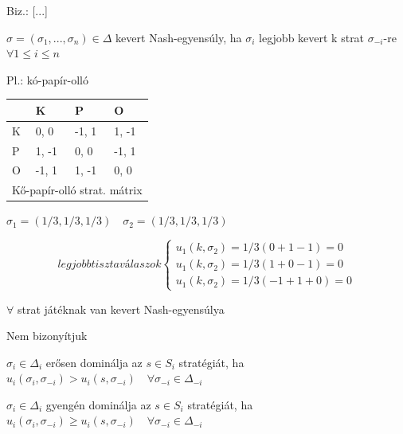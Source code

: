 Biz.: [...]

\begin{definition}{}{}
	$\sigma = (\sigma_1, ..., \sigma_n) \in \Delta$ kevert Nash-egyensúly, ha $\sigma_i$ legjobb kevert k strat $\sigma_{-i}$-re $\forall 1\leq i \leq n$
\end{definition}

Pl.: kó-papír-olló
\begin{center}
	\begin{tabular}{llll}
		\hline
		\multicolumn{1}{|l|}{}  & \multicolumn{1}{l|}{K}     & \multicolumn{1}{l|}{P}     & \multicolumn{1}{l|}{O}     \\ \hline
		\multicolumn{1}{|l|}{K} & \multicolumn{1}{l|}{0, 0}  & \multicolumn{1}{l|}{-1, 1} & \multicolumn{1}{l|}{1, -1} \\ \hline
		\multicolumn{1}{|l|}{P} & \multicolumn{1}{l|}{1, -1} & \multicolumn{1}{l|}{0, 0}  & \multicolumn{1}{l|}{-1, 1} \\ \hline
		\multicolumn{1}{|l|}{O} & \multicolumn{1}{l|}{-1, 1} & \multicolumn{1}{l|}{1, -1} & \multicolumn{1}{l|}{0, 0}  \\ \hline
		\multicolumn{4}{l}{Kő-papír-olló strat. mátrix}                                                               
	\end{tabular}
\end{center}

\begin{center}
	$\sigma_1 = (1/3, 1/3, 1/3) \quad \sigma_2 = (1/3, 1/3, 1/3)$
\end{center}

\[
legjobb tiszta válaszok
\begin{cases}
	u_1(k, \sigma_2) = 1/3(0+1-1)=0 \\
	u_1(k, \sigma_2) = 1/3(1+0-1)=0 \\
	u_1(k, \sigma_2) = 1/3(-1+1+0)=0
\end{cases}
\]

\begin{theorem}{}{}
	$\forall$ strat játéknak van kevert Nash-egyensúlya
\end{theorem}

Nem bizonyítjuk

\begin{definition}{}{}
	$\sigma_i \in \Delta_i$ erősen dominálja az $s \in S_i$ stratégiát, ha $u_i(\sigma_i, \sigma_{-i}) > u_i(s, \sigma_{-i}) \quad \forall \sigma_{-i} \in \Delta_{-i}$
\end{definition}

\begin{definition}{}{}
	$\sigma_i \in \Delta_i$ gyengén dominálja az $s \in S_i$ stratégiát, ha $u_i(\sigma_i, \sigma_{-i}) \geq u_i(s, \sigma_{-i}) \quad \forall \sigma_{-i} \in \Delta_{-i}$
\end{definition}

